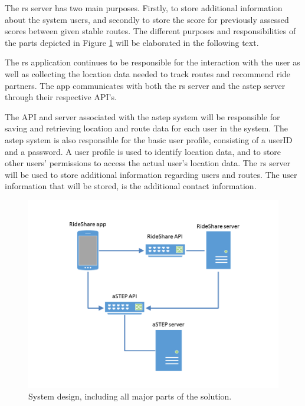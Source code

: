 The \gls{rs} server has two main purposes.
Firstly, to store additional information about the system users, and secondly to store the score \todo{} for previously assessed scores \todo{} between given stable routes.
The different purposes and responsibilities of the parts depicted in Figure \ref{fig:s2systemdesign} will be elaborated in the following text.


The \gls{rs} application continues to be responsible for the interaction with the user as well as collecting the location data needed to track routes and recommend ride partners.
The app communicates with both the \gls{rs} server and the \gls{astep} server through their respective API's.


The API and server associated with the \gls{astep} system will be responsible for saving and retrieving location and route data for each user in the system.
The \gls{astep} system is also responsible for the basic user profile, consisting of a userID and a password.
A user profile is used to identify location data, and to store other users' permissions to access the actual user's location data.
The \gls{rs} server will be used to store additional information regarding users and routes.
The user information that will be stored, is the additional contact information.

\begin{figure}[!h]
	\centering
	\includegraphics[width=\textwidth]{figures/SystemDesign.png}
	\caption{System design, including all major parts of the solution.}
	\label{fig:s2systemdesign}
\end{figure}


